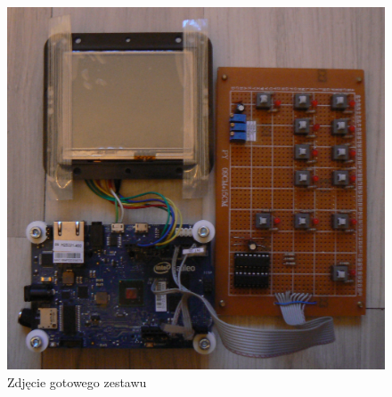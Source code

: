 \documentclass{xmgr}
\begin{document}
\begin{figure}[!h]
    \centering
    	\includegraphics[height=0.35\textheight]{images/zestaw.jpg}
    \caption{Zdjęcie gotowego zestawu}
\end{figure}
\end{document}
